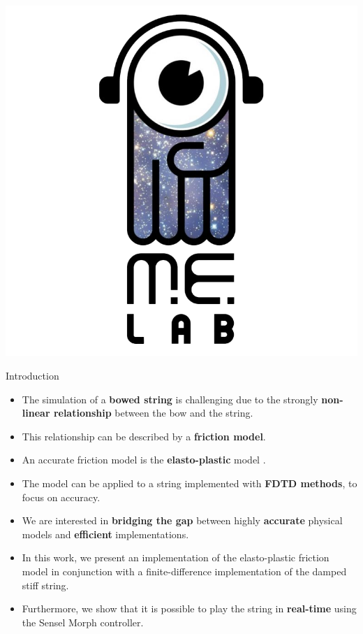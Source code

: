 \documentclass[a0paper,portrait]{baposter}
\let\oldbf\textbf
\renewcommand{\textbf}[1]{\textcolor{aaublue1}{\oldbf{#1}}}
\begin{document}
\begin{poster}
{  \includegraphics[height=0.75\headerheight]{melablogo.png}
}


\begin{posterbox}[name=intro,column=0,row=0]{Introduction}
\begin{itemize}
    \item The simulation of a \textbf{bowed string} is challenging due to the strongly \textbf{non-linear relationship} between the bow and the string.
    \item This relationship can be described by a \textbf{friction model}.
    \item An accurate friction model is the \textbf{elasto-plastic} model \cite{Dupont2002}.
    \item The model can be applied to a string implemented with \textbf{FDTD methods}, to focus on accuracy. 
    \item We are interested in \textbf{bridging the gap} between highly \textbf{accurate} physical models and \textbf{efficient} implementations. \item In this work, we present an implementation of the elasto-plastic friction model in conjunction with a finite-difference implementation of the damped stiff string. 
    \item Furthermore, we show that it is possible to play the string in \textbf{real-time} using the Sensel Morph controller.
\end{itemize}
\end{posterbox}


\end{poster}
\end{document}
